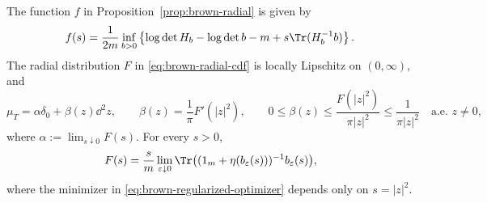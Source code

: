 \begin{proposition}\label{prop:brown-radial-details}
The function $f$ in Proposition~\ref{prop:brown-radial} is given by
\begin{equation}\label{eq:brown-radial-envelope}
 f(s)=\frac1{2m}\inf_{b>0}
 \left\{\log\det H_b-\log\det b-m
                       +s\Tr(H_b^{-1}b)\right\}.
\end{equation}
The radial distribution $F$ in \eqref{eq:brown-radial-cdf} is locally Lipschitz on $(0,\infty)$, and
\begin{equation}\label{eq:brown-radial-density}
 \mu_T=\alpha\delta_0+\beta(z)\dd^2z,\qquad
 \beta(z)=\frac1\pi F'(|z|^2),\qquad
 0\le\beta(z)\le\frac{F(|z|^2)}{\pi|z|^2}
              \le\frac1{\pi|z|^2}\quad\text{a.e. }z\ne0,
\end{equation}
where $\alpha:=\lim_{s\downarrow0}F(s)$.
For every $s>0$,
\begin{equation}\label{eq:brown-radial-optimizer}
 F(s)=\frac{s}{m}\lim_{\varepsilon\downarrow0}
 \Tr\bigl((1_m+\eta(b_\varepsilon(s)))^{-1}b_\varepsilon(s)\bigr),
\end{equation}
where the minimizer in \eqref{eq:brown-regularized-optimizer} depends only on $s=|z|^2$.
\end{proposition}
